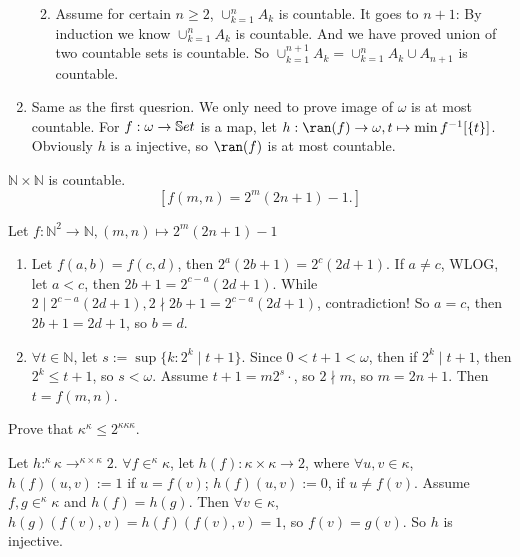 \documentclass{ctexart}
\begin{document}
\begin{solution}
\begin{enumerate}
\begin{enumerate}
\begin{enumerate}
        \end{enumerate}
        \item Assume for certain $n\geq 2$, $\cup_{k=1}^nA_k$ is countable. It goes to $n+1$: By induction we know $ \cup_{k=1}^nA_k$ is countable. And we have proved union of two countable sets is countable. So $\cup_{k=1}^{n+1}A_k=\cup_{k=1}^nA_k\cup A_{n+1}$ is countable.
    \end{enumerate}
     \item Same as the first quesrion. We only need to prove image of $\omega$ is at most countable. For $f:\omega\to \mathbb{S}et$ is a map, let $h:\ran(f)\to \omega,t\mapsto \min f^{-1}[\{t\}]$. Obviously $h$ is a injective, so $\ran(f)$ is at most countable. 
    \end{enumerate}
   \end{solution}


\begin{problem}
$\mathbb{N} \times \mathbb{N}$ is countable.
$$
\left[f(m, n)=2^m(2 n+1)-1 .\right]
$$
\end{problem}

\begin{solution}
    Let $f:\mathbb{N}^2\to \mathbb{N},(m,n)\mapsto 2^m(2n+1)-1$ 
    \begin{enumerate}
        \item Let $f(a,b)=f(c,d)$, then $2^a(2b+1)=2^c(2d+1)$. If $a\neq c$, WLOG, let $a<c$, then $2b+1=2^{c-a}(2d+1)$. While $2\mid 2^{c-a}(2d+1),2\nmid 2b+1=2^{c-a}(2d+1)$, contradiction! So $a=c$, then $2b+1=2d+1$, so $b=d$.
        \item $\forall t\in \mathbb{N}$, let $s:=\sup\{k:2^k\mid t+1\}$. Since $0<t+1<\omega$, then if $2^k\mid t+1$, then $2^k\leq t+1$, so $s<\omega$. Assume $t+1=m2^s\cdot $, so $2\nmid m$, so $m=2n+1$. Then $t=f(m,n)$. 
    \end{enumerate}
\end{solution}

\begin{problem}
Prove that $\kappa^\kappa \leq 2^{\kappa \kappa \kappa}$.
\end{problem}
\newcommand{\fun}[2]{^{#1}{#2}}
\begin{solution}
    Let $h:\fun{\kappa}{\kappa}\to \fun{\kappa\times \kappa}{2}$. $\forall f\in \fun{\kappa}{\kappa}$, let $h(f):\kappa\times \kappa\to2$, where $\forall u,v\in \kappa$, $h(f)(u,v):=1$ if $u= f(v)$; $h(f)(u,v):=0$, if $u\neq f(v)$. Assume $f,g\in \fun{\kappa}{\kappa}$ and $h(f)=h(g)$. Then $\forall v\in \kappa$, $h(g)(f(v),v)=h(f)(f(v),v)=1$, so $f(v)=g(v)$. So $h$ is injective. 
   \end{solution}
\end{document}

